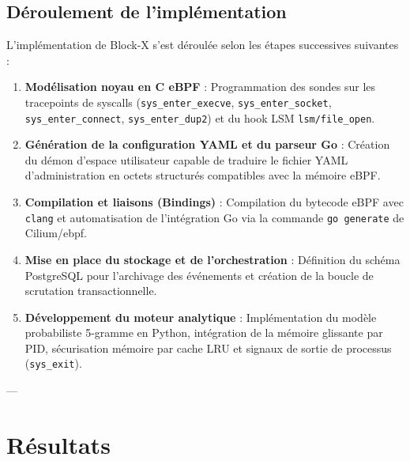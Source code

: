 \documentclass[11pt,a4paper]{article}
\begin{document}
\subsection{Déroulement de l'implémentation}
L'implémentation de Block-X s'est déroulée selon les étapes successives suivantes :
\begin{enumerate}
    \item \textbf{Modélisation noyau en C eBPF} : Programmation des sondes sur les tracepoints de syscalls (\texttt{sys\_enter\_execve}, \texttt{sys\_enter\_socket}, \texttt{sys\_enter\_connect}, \texttt{sys\_enter\_dup2}) et du hook LSM \texttt{lsm/file\_open}.
    \item \textbf{Génération de la configuration YAML et du parseur Go} : Création du démon d'espace utilisateur capable de traduire le fichier YAML d'administration en octets structurés compatibles avec la mémoire eBPF.
    \item \textbf{Compilation et liaisons (Bindings)} : Compilation du bytecode eBPF avec \texttt{clang} et automatisation de l'intégration Go via la commande \texttt{go generate} de Cilium/ebpf.
    \item \textbf{Mise en place du stockage et de l'orchestration} : Définition du schéma PostgreSQL pour l'archivage des événements et création de la boucle de scrutation transactionnelle.
    \item \textbf{Développement du moteur analytique} : Implémentation du modèle probabiliste 5-gramme en Python, intégration de la mémoire glissante par PID, sécurisation mémoire par cache LRU et signaux de sortie de processus (\texttt{sys\_exit}).
\end{enumerate}

---

\section{Résultats}
\end{document}
